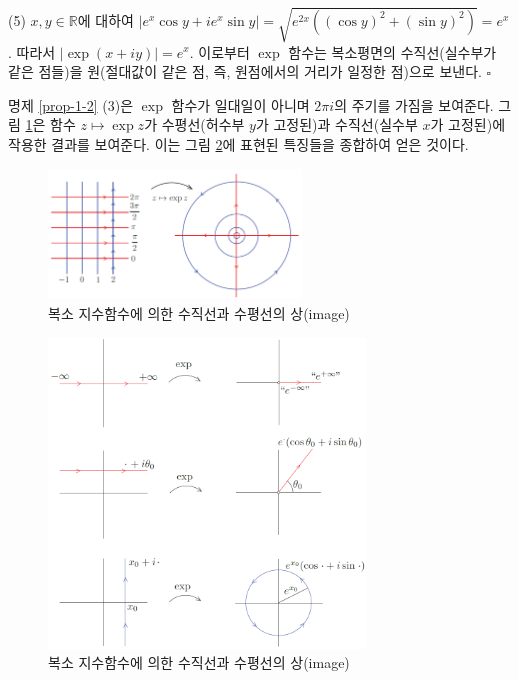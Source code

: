 \noindent
(5) $x,y \in \mathbb R$에 대하여
$|e^x \cos y + ie^x\sin y| = \sqrt{e^{2x}((\cos y)^2 + (\sin y)^2)} = e^x$.
따라서 $|\exp(x+iy)| = e^x$.
이로부터 $\exp$ 함수는 복소평면의 수직선(실수부가 같은 점들)을
원(절대값이 같은 점, 즉, 원점에서의 거리가 일정한 점)으로 보낸다.
\hfill $\square$

명제 \ref{prop-1-2} (3)은 $\exp$ 함수가 일대일이 아니며
$2\pi i$의 주기를 가짐을 보여준다.
그림 \ref{fig-1-16}은 함수 $z\mapsto \exp z$가
수평선(허수부 $y$가 고정된)과 수직선(실수부 $x$가 고정된)에 작용한 결과를 보여준다.
이는 그림 \ref{fig-1-17}에 표현된 특징들을 종합하여 얻은 것이다.

\begin{figure}[!h]
\begin{center}
\includegraphics[width=0.6\textwidth]{./SaltChapter/figs/fig-1-16}
\end{center}
\caption{복소 지수함수에 의한 수직선과 수평선의 상(image)}
\label{fig-1-16}
\end{figure}

\begin{figure}[!h]
\begin{center}
\includegraphics[width=0.75\textwidth]{./SaltChapter/figs/fig-1-17}
\end{center}
\caption{복소 지수함수에 의한 수직선과 수평선의 상(image)}
\label{fig-1-17}
\end{figure}

